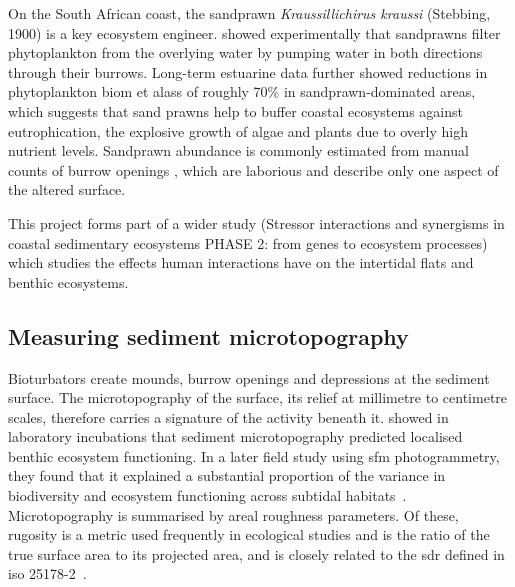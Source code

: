 On the South African coast, the sandprawn \textit{Kraussillichirus kraussi} (Stebbing, 1900) is a key ecosystem engineer. \citet{venterWaterFiltrationBurrowing2020} showed experimentally that sandprawns filter phytoplankton from the overlying water by pumping water in both directions through their burrows. Long-term estuarine data further showed reductions in phytoplankton biom et alass of roughly 70\% in sandprawn-dominated areas\citep{venterWaterFiltrationBurrowing2020}, which suggests that sand prawns help to buffer coastal ecosystems against \gls{eutrophication}, the explosive growth of algae and plants due to overly high nutrient levels. Sandprawn abundance is commonly estimated from manual counts of burrow openings \citep{nelAssessmentAbundanceDistribution2013}, which are laborious and describe only one aspect of the altered surface.

This project forms part of a wider study (Stressor interactions and synergisms in coastal sedimentary ecosystems PHASE 2: from genes to ecosystem processes) which studies the effects human interactions have on the \gls{intertidal} flats and benthic ecosystems. 

\subsection{Measuring sediment microtopography}
\label{subsec:ch1.background.microtopography}
Bioturbators create mounds, burrow openings and depressions at the sediment surface. The \gls{microtopography} of the surface, its relief at millimetre to centimetre scales, therefore carries a signature of the activity beneath it. \citet{schenoneSedimentMicrotopographyPredicts2024} showed in laboratory incubations that sediment microtopography predicted localised benthic ecosystem functioning. In a later field study using \gls{sfm} photogrammetry, they found that it explained a substantial proportion of the variance in biodiversity and ecosystem functioning across \gls{subtidal} habitats~\citep{schenoneSeafloorSedimentMicrotopography2025}. Microtopography is summarised by areal roughness parameters. Of these, \gls{rugosity} is a metric used frequently in ecological studies\citep{lazarusReviewSeascapeComplexity2021} and is the ratio of the true surface area to its projected area, and is closely related to the \gls{sdr} defined in \acrshort{iso} 25178-2~\citep{ISO2517822021}.

